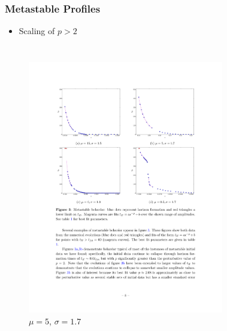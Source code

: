\documentclass[mathserif,10pt]{beamer}
\newcommand{\bi}{\begin{itemize}}
\newcommand{\ei}{\end{itemize}}
\newcommand{\its}{\item}
\begin{document}
\frame
{
  \frametitle{Metastable Profiles}
  \bi
  \its Scaling of $p > 2$
  \ei
  \begin{columns}
    \begin{figure}
    \centering
    \includegraphics[scale=0.75]{m5w17} \\ $\mu = 5$, $\sigma = 1.7$
    \end{figure}
    \begin{figure}
    \centering

\end{figure}
\end{columns}}
\end{document}
